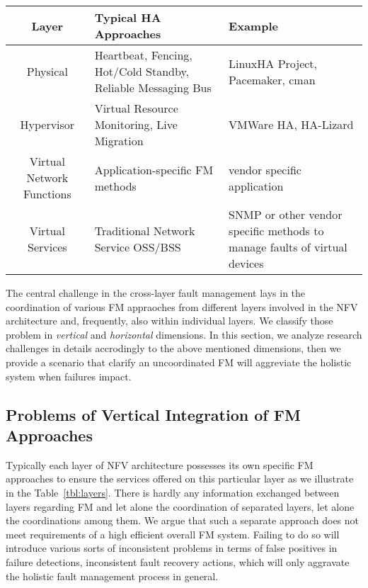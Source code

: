 \label{problemstatement}

\begin{table*}[!t]
\centering
\caption{Specific FM Approaches to Different NFV Layers}
\label{tbl:layers}
	\begin{tabular}{c|p{3cm}|p{5cm}}
		\hline
		\textbf{Layer} & \textbf{Typical HA Approaches} & \textbf{Example}\\
		\hline
		\hline
		Physical	&	Heartbeat, Fencing, Hot/Cold Standby, Reliable Messaging Bus &
LinuxHA Project, Pacemaker, cman \\
		Hypervisor & Virtual Resource Monitoring, Live Migration & VMWare HA, HA-Lizard \\
		Virtual Network Functions & Application-specific FM methods & vendor
specific application \\
		Virtual Services & Traditional Network Service OSS/BSS & SNMP or other
vendor specific methods to manage faults of virtual devices \\
\hline
	\end{tabular}
\end{table*} 
 
The central challenge in the cross-layer fault management lays in the coordination
of various FM appraoches from different layers involved in the NFV architecture
and, frequently, also within individual layers. We classify those problem in
\emph{vertical} and \emph{horizontal} dimensions. In this section, we analyze
research challenges in details accrodingly to the above mentioned dimensions,
then we provide a scenario that clarify an uncoordinated FM will aggreviate the
holistic system when failures impact. 

\subsection{Problems of Vertical Integration of FM Approaches} 

Typically each layer of NFV architecture possesses its own specific FM
approaches to ensure the services offered on this particular layer as we
illustrate in the Table~\ref{tbl:layers}. There is hardly any information
exchanged between layers regarding FM and let alone the coordination of
separated layers, let alone the coordinations among them. We argue that such a
separate approach does not meet requirements of a high efficient overall FM
system. Failing to do so will introduce various sorts of inconsistent problems
in terms of false positives in failure detections, inconsistent fault recovery
actions, which will only aggravate the holistic fault management process in general.

